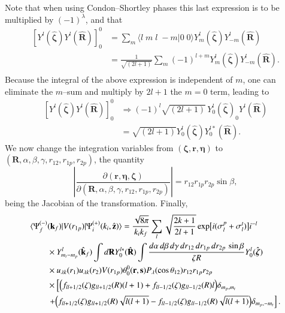 Note that when using Condon--Shortley phases this last expression is to be multiplied by $(-1)^\lambda$, and that
\begin{equation}\label{eq7_2_21}
  \begin{split}
\left[Y^{l}(\hat{\boldsymbol{\zeta}})Y^{l}(\hat{\mathbf{R}})\right]^{0}_{0}&=\sum_m \langle l \;m\;l\;-m|0\;0\rangle Y^{l}_m(\hat{\boldsymbol{\zeta}}) Y^{l}_{-m}(\hat{\mathbf{R}})\\
&=\frac{1}{\sqrt{(2l+1)}}\sum_m (-1)^{l+m}Y^{l}_m(\hat{\boldsymbol{\zeta}}) Y^{l}_{-m}(\hat{\mathbf{R}}).\\
  \end{split}
\end{equation}
Because the integral of the above expression is independent of $m$, one can eliminate the $m$--sum and multiply by $2l+1$ the $m=0$ term, leading to
\begin{equation}\label{eq115}
  \begin{split}
\left[Y^{l}(\hat{\boldsymbol{\zeta}})Y^{l}(\hat{\mathbf{R}})\right]^{0}_{0}&\Rightarrow(-1)^l\sqrt{(2l+1)}  \, Y^{l}_0(\hat{\boldsymbol{\zeta}})_0Y^{l}(\hat{\mathbf{R}})\\
&=\sqrt{(2l+1)}Y^{l}_0(\hat{\boldsymbol{\zeta}}) Y_0^{l*}(\hat{\mathbf{R}}).
\end{split}
\end{equation}
We now change the integration variables from $(\boldsymbol{\zeta},\mathbf{r},\boldsymbol{\eta})$ to $(\mathbf{R},\alpha,\beta,\gamma,r_{12},r_{1p},r_{2p})$, the quantity
\begin{equation}\label{eq113}
\left|\frac{\partial(\mathbf{r},\boldsymbol{\eta},\boldsymbol{\zeta})}
{\partial(\mathbf{R},\alpha,\beta,\gamma,r_{12},r_{1p},r_{2p})}\right|=r_{12}r_{1p}r_{2p}\sin\beta,
\end{equation}
being the Jacobian of the transformation.
Finally,
\begin{equation}\label{eq114}
  \begin{split}
  \langle \Psi_f^{(-)}&(\mathbf{k}_f)|V(r_{1p})|\Psi_i^{(+)}(k_i,\hat {\mathbf{z}})\rangle=\frac{\sqrt{8\pi}}{k_ik_f}\sum_{l}
  \sqrt{\frac{2k+1}{2l+1}}\exp\bigl[i(\sigma_{l}^p+\sigma_{l}^t)\bigr]i^{-l}\\
  &\times Y_{m_t-m_p}^{l}(\hat{\mathbf{k}}_f) \int d\mathbf{R} Y_0^{l*}(\hat{\mathbf{R}})\int \frac {d\alpha\, d\beta\, d\gamma \, dr_{12}\,dr_{1p}\,dr_{2p}\,\sin\beta} {\zeta R}Y^{l}_0(\hat{\boldsymbol{\zeta}})\\
  &\times u_{\lambda k}(r_1)u_{\lambda k}(r_2)V(r_{1p})\theta_0^0(\mathbf{r},\mathbf{s})
  P_\lambda(\cos \theta_{12})r_{12}r_{1p}r_{2p}\\
  &\times \left[\Bigl(f_{ll+1/2}(\zeta)g_{ll+1/2}(R)(l+1)+f_{ll-1/2}(\zeta)g_{ll-1/2}(R)l\Bigr)\delta_{m_p,m_t}\right.\\
  &\left.+\Bigl(f_{ll+1/2}(\zeta)g_{ll+1/2}(R)\sqrt{l(l+1)}-f_{ll-1/2}(\zeta)g_{ll-1/2}(R)
  \sqrt{l(l+1)}\Bigr)\delta_{m_p,-m_t}\right].
  \end{split}
\end{equation}
